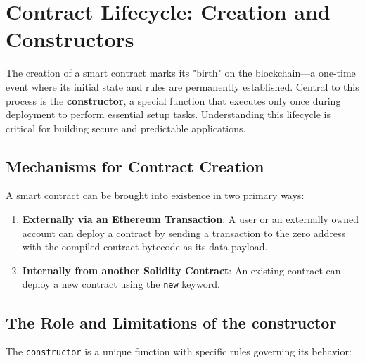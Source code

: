 \documentclass{scrbook}
\begin{document}
\chapter{Contract Lifecycle: Creation and Constructors}

The creation of a smart contract marks its "birth" on the blockchain—a one-time event where its initial state and rules are permanently established. Central to this process is the \textbf{constructor}, a special function that executes only once during deployment to perform essential setup tasks. Understanding this lifecycle is critical for building secure and predictable applications.

\section{Mechanisms for Contract Creation}

A smart contract can be brought into existence in two primary ways:

\begin{enumerate}
    \item \textbf{Externally via an Ethereum Transaction}: A user or an externally owned account can deploy a contract by sending a transaction to the zero address with the compiled contract bytecode as its data payload.
    
    \item \textbf{Internally from another Solidity Contract}: An existing contract can deploy a new contract using the \texttt{new} keyword.
\end{enumerate}

\section{The Role and Limitations of the constructor}

The \texttt{constructor} is a unique function with specific rules governing its behavior:
\end{document}
